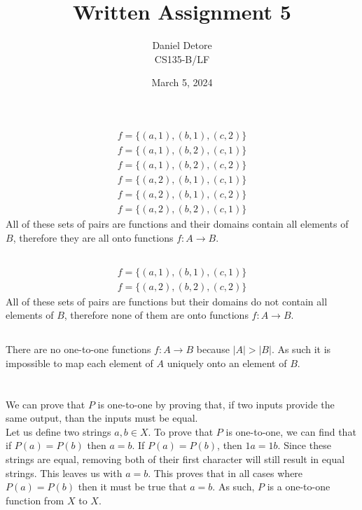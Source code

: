 \documentclass{article}
\title{Written Assignment 5}
\author{Daniel Detore\\CS135-B/LF}
\date{March 5, 2024}
\begin{document}
\maketitle

\section{}
\subsection{}
\begin{gather*}
    f = \{ (a, 1), (b, 1), (c, 2) \} \\
    f = \{ (a, 1), (b, 2), (c, 1) \} \\
    f = \{ (a, 1), (b, 2), (c, 2) \} \\
    f = \{ (a, 2), (b, 1), (c, 1) \} \\
    f = \{ (a, 2), (b, 1), (c, 2) \} \\
    f = \{ (a, 2), (b, 2), (c, 1) \}
\end{gather*}
All of these sets of pairs are functions and their domains contain all elements 
of $B$, therefore they are all onto functions $f: A \rightarrow B$.

\subsection{}
\begin{gather*}
    f = \{ (a, 1), (b, 1), (c, 1) \} \\
    f = \{ (a, 2), (b, 2), (c, 2) \}
\end{gather*}
All of these sets of pairs are functions but their domains do not contain all 
elements of $B$, therefore none of them are onto functions $f: A \rightarrow B$.

\subsection{}
There are no one-to-one functions $f: A \rightarrow B$ because $|A| > |B|$. As such
it is impossible to map each element of $A$ uniquely onto an element of $B$.

\section{}
\subsection{}
We can prove that $P$ is one-to-one by proving that, if two inputs provide the same output, than the inputs must be equal.\\
Let us define two strings $a, b \in X$. To prove that $P$ is one-to-one, we can find that if $P(a) = P(b)$ then $a = b$. 
If $P(a) = P(b)$, then $1a = 1b$.
Since these strings are equal, removing both of their first character will still result in equal strings. This leaves us with $a = b$. 
This proves that in all cases where $P(a) = P(b)$ then it must be true that $a = b$. As such, $P$ is a one-to-one function from $X$ to $X$.
\end{document}
